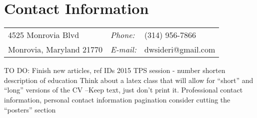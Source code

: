 \section{\sc Contact Information}
\vspace{.05in}
\begin{tabular}{@{}p{2in}p{0.5in}p{2in}}
4525 Monrovia Blvd &   {\it Phone:} &  (314) 956-7866\\
Monrovia, Maryland 21770   &   {\it E-mail:}  & dwsideri@gmail.com
\end{tabular}

TO DO:
Finish new articles, ref IDs
2015 TPS session - number
shorten description of education
Think about a latex class that will allow for ``short'' and ``long'' versions of the CV
--Keep text, just don't print it.
Professional contact information, personal contact information
pagination
consider cutting the ``posters'' section



